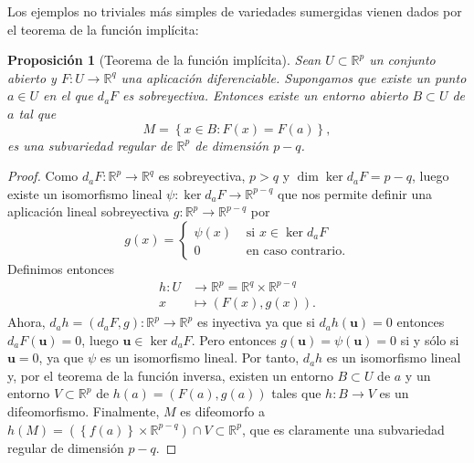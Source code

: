 \documentclass[12pt,a4paper]{book}
\newtheorem{prop}[thm]{Proposición}
\theoremstyle{definition} \newtheorem{defn}[thm]{Definición}
\theoremstyle{definition} \newtheorem{ejemplo}[thm]{Ejemplo}
\theoremstyle{definition} \newtheorem{ejercicio}[thm]{Ejercicio}
\theoremstyle{remark} \newtheorem*{obs}{Observación}
\def\RR{\mathbb{R}}
\newcommand{\ve}[1]{\mathbf{#1}}
\begin{document}
    Los ejemplos no triviales más simples de variedades sumergidas vienen dados por el teorema de la función implícita: 
    \begin{prop}[Teorema de la función implícita]
    Sean $U\subset \RR^p$ un conjunto abierto y $F: U \rightarrow \RR^q$ una aplicación diferenciable. Supongamos que existe un punto $a\in U$ en el que $d_a F$ es sobreyectiva. Entonces existe un entorno abierto $B\subset U$ de $a$ tal que
    \begin{equation*}
      M=\left\{ x\in B: F(x)=F(a) \right\},
    \end{equation*}
    es una subvariedad regular de $\RR^p$ de dimensión $p-q$.
    \end{prop}
    \begin{proof}
      Como $d_a F:\RR^p \rightarrow \RR^q$ es sobreyectiva, $p>q$ y $\dim \ker d_a F =p-q$, luego existe un isomorfismo lineal $\psi:\ker d_a F \rightarrow \RR^{p-q}$ que nos permite definir una aplicación lineal sobreyectiva $g:\RR^p \rightarrow \RR^{p-q}$ por
      \begin{equation*}
	g(x)=
	\begin{cases}
	  \psi(x) & \text{ si } x \in \ker d_aF \\
	  0 & \text{ en caso contrario.}
	\end{cases}
      \end{equation*}
      Definimos entonces
      \begin{align*}
	h :U&\longrightarrow \RR^p=\RR^q \times \RR^{p-q}\\ 
	  x &\longmapsto (F(x),g(x)). 
	\end{align*}
	Ahora, $d_a h=(d_a F, g):\RR^p \rightarrow \RR^p$ es inyectiva ya que si $d_a h (\ve{u})=0$ entonces $d_a F(\ve{u})=0$, luego $\ve{u}\in \ker d_a F$. Pero entonces $g(\ve{u})=\psi(\ve{u})=0$ si y sólo si $\ve{u}=0$, ya que $\psi$ es un isomorfismo lineal. Por tanto, $d_a h$ es un isomorfismo lineal y, por el teorema de la función inversa, existen un entorno $B\subset U$ de $a$ y un entorno $V\subset \RR^p$ de $h(a)=(F(a),g(a))$ tales que $h:B\rightarrow V$ es un difeomorfismo. Finalmente, $M$ es difeomorfo a $h(M)=(\left\{ f(a) \right\}\times \RR^{p-q}) \cap V\subset \RR^p$, que es claramente una subvariedad regular de dimensión $p-q$. 
    \end{proof}
\end{document}
